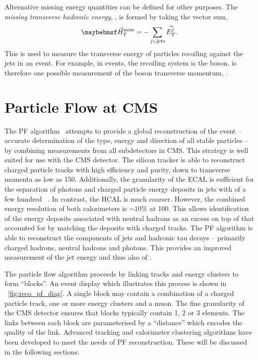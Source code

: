 Alternative missing energy quantities can be defined for other purposes. The
\emph{missing transverse hadronic energy}, \MHT, is formed by taking the vector
sum,
\begin{equation*}
\MHTv = -\sum_{j \in \textrm{jets}} \vec{E_T^j}.
\end{equation*}
This is used to measure the transverse energy of particles recoiling against the
jets in an event. For example, in \Wjets events, the recoiling system is the \PW
boson. \MHTv is therefore one possible measurement of the \PW boson transverse
momentum, \PtWv.


\section{Particle Flow at \acs{CMS}}
\label{sec:reco_pf}
The \ac{PF} algorithm~\cite{cms_pf_pas,cms_pf_pas2} attempts to provide a
global reconstruction of the event -- accurate determination of the type, energy
and direction of all stable particles -- by combining measurements from all
subdetectors in \ac{CMS}. This strategy is well suited for use with the \ac{CMS}
detector. The silicon tracker is able to reconstruct charged particle tracks
with high efficiency and purity, down to transverse momenta as low as
\unit{150}{\MeV}. Additionally, the granularity of the \ac{ECAL} is sufficient
for the separation of photons and charged particle energy deposits in jets with
\Pt of a few hundred \GeV~\cite{cms_pf_pas}. In contrast, the \ac{HCAL} is much
coarser. However, the combined energy resolution of both calorimeters is $\sim
10\%$ at \unit{100}{\GeV}. This allows identification of the energy deposits
associated with neutral hadrons as an excess on top of that accounted for by
matching the deposits with charged tracks. The \ac{PF} algorithm is able to
reconstruct the components of jets and hadronic tau decays -- primarily charged
hadrons, neutral hadrons and photons. This provides an improved measurement of
the jet energy and thus also of \METv.

The particle flow algorithm proceeds by linking tracks and energy clusters to
form ``blocks''. An event display which illustrates this process is shown in
\fig~\ref{fig:reco_pf_diag}. A single block may contain a combination of a
charged particle track, one or more energy clusters and a muon. The fine
granularity of the \ac{CMS} detector ensures that blocks typically contain 1, 2
or 3 elements.  The links between each block are parameterised by a ``distance''
which encodes the quality of the link. Advanced tracking and calorimeter
clustering algorithms have been developed to meet the needs of \ac{PF}
reconstruction. These will be discussed in the following sections.

